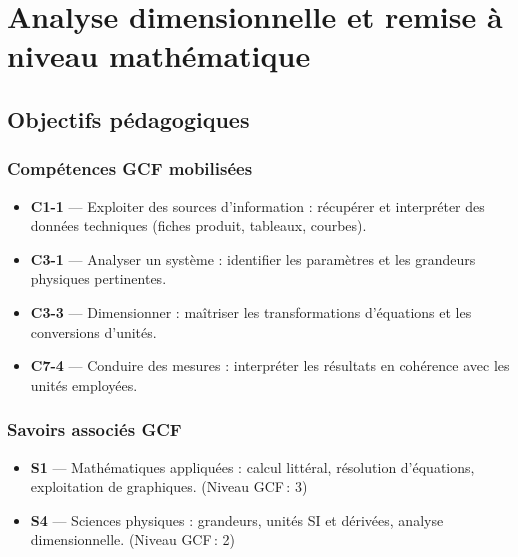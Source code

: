 
\chapter{Analyse dimensionnelle et remise à niveau mathématique}

\section{Objectifs pédagogiques}

\subsection*{Compétences GCF mobilisées}

\begin{itemize}
  \item \textbf{C1-1} — Exploiter des sources d'information : récupérer et interpréter des
        données techniques (fiches produit, tableaux, courbes).
  \item \textbf{C3-1} — Analyser un système : identifier les paramètres et les grandeurs
        physiques pertinentes.
  \item \textbf{C3-3} — Dimensionner : maîtriser les transformations d'équations et les
        conversions d'unités.
  \item \textbf{C7-4} — Conduire des mesures : interpréter les résultats en cohérence avec
        les unités employées.
\end{itemize}

\subsection*{Savoirs associés GCF}

\begin{itemize}
  \item \textbf{S1} — Mathématiques appliquées : calcul littéral, résolution d'équations,
        exploitation de graphiques. (Niveau GCF\,: 3)
  \item \textbf{S4} — Sciences physiques : grandeurs, unités SI et dérivées, analyse
        dimensionnelle. (Niveau GCF\,: 2)
\end{itemize}


